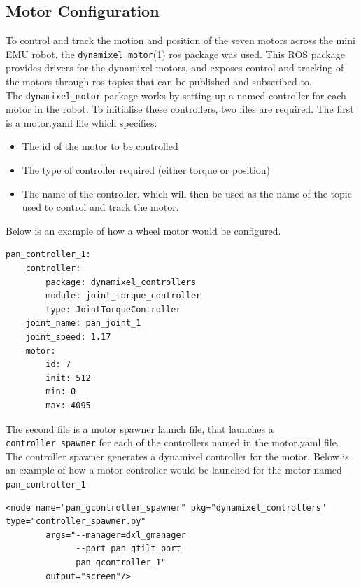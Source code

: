 \documentclass[titlepage,12pt,a4paper]{article}
\begin{document}
\subsection{Motor Configuration}
To control and track the motion and position of the seven motors across the mini EMU robot, the \texttt{dynamixel\_motor}(1) ros package was used. This ROS package provides drivers for the dynamixel motors, and exposes control and tracking of the motors through ros topics that can be published and subscribed to. \\

\noindent The \texttt{dynamixel\_motor} package works by setting up a named controller for each motor in the robot. To initialise these controllers, two files are required. The first is a motor.yaml file which specifies:
\begin{itemize}
    \item The id of the motor to be controlled
    \item The type of controller required (either torque or position)
    \item The name of the controller, which will then be used as the name of the topic used to control and track the motor.
\end{itemize}
Below is an example of how a wheel motor would be configured.

\begin{lstlisting}
pan_controller_1:
    controller:
        package: dynamixel_controllers
        module: joint_torque_controller
        type: JointTorqueController
    joint_name: pan_joint_1
    joint_speed: 1.17
    motor:
        id: 7
        init: 512
        min: 0
        max: 4095
\end{lstlisting}


\noindent The second file is a motor spawner launch file, that launches a \texttt{controller\_spawner} for each of the controllers named in the motor.yaml file. The controller spawner generates a dynamixel controller for the motor. Below is an example of how a motor controller would be launched for the motor named \texttt{pan\_controller\_1}\\

\begin{lstlisting}
<node name="pan_gcontroller_spawner" pkg="dynamixel_controllers" type="controller_spawner.py"
        args="--manager=dxl_gmanager
              --port pan_gtilt_port
              pan_gcontroller_1"
        output="screen"/>
\end{lstlisting}
\end{document}
